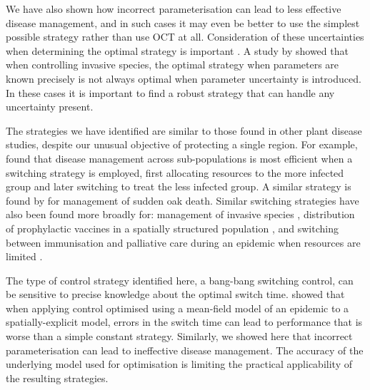We have also shown how incorrect parameterisation can lead to less effective disease management, and in such cases it may even be better to use the simplest possible strategy rather than use OCT at all. Consideration of these uncertainties when determining the optimal strategy is important \citep{epanchin_controlling_2010}. A study by \citet{carrasco_optimal_2009} showed that when controlling invasive species, the optimal strategy when parameters are known precisely is not always optimal when parameter uncertainty is introduced. In these cases it is important to find a robust strategy that can handle any uncertainty present.

The strategies we have identified are similar to those found in other plant disease studies, despite our unusual objective of protecting a single region. For example, \citet{ndeffo_mbah_resource_2011} found that disease management across sub-populations is most efficient when a switching strategy is employed, first allocating resources to the more infected group and later switching to treat the less infected group. A similar strategy is found by \citet{ndeffo_mbah_optimization_2010} for management of sudden oak death. Similar switching strategies have also been found more broadly for: management of invasive species \citep{carrasco_optimal_2009}, distribution of prophylactic vaccines in a spatially structured population \citep{keeling_optimal_2012}, and switching between immunisation and palliative care during an epidemic when resources are limited \citep{klepac_optimizing_2012}.

The type of control strategy identified here, a bang-bang switching control, can be sensitive to precise knowledge about the optimal switch time. \citet{forster_optimizing_2007} showed that when applying control optimised using a mean-field model of an epidemic to a spatially-explicit model, errors in the switch time can lead to performance that is worse than a simple constant strategy. Similarly, we showed here that incorrect parameterisation can lead to ineffective disease management. The accuracy of the underlying model used for optimisation is limiting the practical applicability of the resulting strategies.

